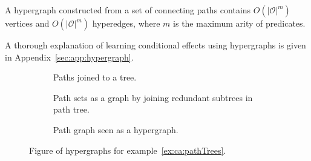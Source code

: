 \documentclass[\master/Master.tex]{subfiles}
\begin{document}
A hypergraph constructed from a set of connecting paths contains $O\left(|\mathcal{O}|^m\right)$ vertices and $O\left( |\mathcal{O}|^m\right)$ hyperedges, where $m$ is the maximum arity of predicates. 

A thorough explanation of learning conditional effects using hypergraphs is given in Appendix~\ref{sec:app:hypergraph}.



\begin{figure}
    \centering
    \begin{subfigure}[t]{0.30\textwidth}
        \centering
        \raisebox{-0.5\height}{\resizebox{\linewidth}{!}{}}
        \caption{Paths joined to a tree.}
        \label{fig:ca:graphExTree}
    \end{subfigure}%
    \hfill%
    \begin{subfigure}[t]{0.30\textwidth}
        \centering
        \resizebox{1\linewidth}{!}{\raisebox{-0.5\height}{}}
        \caption{Path sets as a graph by joining redundant subtrees in path tree.}
        \label{fig:ca:graphExGraph}
    \end{subfigure}
    \hfill%
    \begin{subfigure}[t]{0.30\textwidth}
        \centering
        \resizebox{1\linewidth}{!}{\raisebox{-0.5\height}{}}
        \caption{Path graph seen as a hypergraph.}
        \label{fig:ca:graphExHG}
    \end{subfigure}
    \caption{Figure of hypergraphs for example~\ref{ex:ca:pathTrees}.}\label{fig:ex:ca:hgi}
\end{figure}
%
\end{document}
